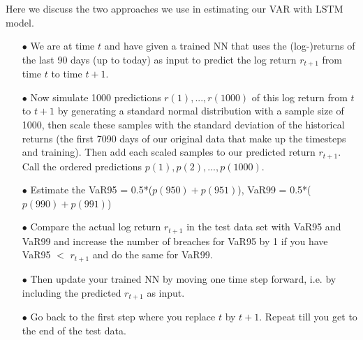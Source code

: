 \documentclass[a4paper,11pt,oneside]{book}
\begin{document}
Here we discuss the two approaches we use in estimating our VAR with LSTM model. 
\begin{itemize}
	
\item[$\bullet$]   We are at time $t$ and have given a trained NN that uses the (log-)returns of the last 90 days (up to
today) as input to predict the log return $r_{t+1}$ from time $t$ to time $t+1$.
\item[$\bullet$]      Now simulate 1000 predictions $r(1), ..., r(1000)$ of this log return from $t$ to $t+1$ by generating a standard normal distribution with a sample size of 1000, then scale these samples with the standard deviation of the historical returns (the first 7090 days of our original data that make up the timesteps and training). Then add each scaled samples to  our predicted return $r_{t+1}$. Call the ordered
predictions $p(1),p(2),...,p(1000)$.

\item[$\bullet$] Estimate the VaR95 = 0.5*($p(950)+p(951)$), VaR99 = 0.5*($p(990)+p(991)$)


\item[$\bullet$] Compare the actual log return $r_{t+1}$ in the test data set with VaR95 and VaR99 and increase the number
of breaches for VaR95 by 1 if you have VaR95 $<$ $r_{t+1}$ and do the same for VaR99.

\item[$\bullet$] Then update your trained NN by moving one time step forward, i.e. by including the predicted $r_{t+1}$ as input.
\item[$\bullet$] Go back to the first step where you replace $t$ by $t+1$. Repeat till you get to the end of the test data.

\end{itemize}


\end{document}
